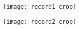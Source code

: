 \begin{figure*}
  \centering
  \texttt{[image: record1-crop]}
\end{figure*}
\begin{figure*}
  \centering
  \texttt{[image: record2-crop]}
\end{figure*}
